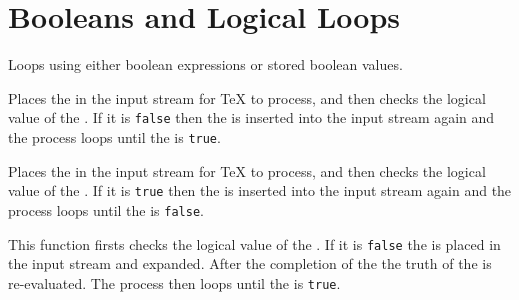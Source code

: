 \documentclass[oneside]{book}
\begin{document}
\section{Booleans and Logical Loops}

Loops using either boolean expressions or stored boolean values.

\begin{function}{\boolVarDoUntil}
\begin{syntax}
  
\end{syntax}
Places the  in the input stream for \TeX{} to process,
and then checks the logical value of the .  If it is
\texttt{false} then the  is inserted into the input
stream again and the process loops until the  is
\texttt{true}.
\begin{demohigh}
\IgnoreSpacesOn
\boolSetFalse \lTmpaBool
\intZero \lTmpaInt
\clistClear \lTmpaClist
\boolVarDoUntil {}
\clistVarJoin \lTmpaClist {:}
\IgnoreSpacesOff
\end{demohigh}
\end{function}

\begin{function}{\boolVarDoWhile}
\begin{syntax}
  
\end{syntax}
Places the  in the input stream for \TeX{} to process,
and then checks the logical value of the .  If it is
\texttt{true} then the  is inserted into the input
stream again and the process loops until the  is
\texttt{false}.
\begin{demohigh}
\IgnoreSpacesOn
\boolSetTrue \lTmpaBool
\intZero \lTmpaInt
\clistClear \lTmpaClist
\boolVarDoWhile {}
\clistVarJoin \lTmpaClist {:}
\IgnoreSpacesOff
\end{demohigh}
\end{function}

\begin{function}{\boolVarUntilDo}
\begin{syntax}
  
\end{syntax}
This function firsts checks the logical value of the .
If it is \texttt{false} the  is placed in the input stream
and expanded. After the completion of the  the truth
of the  is re-evaluated. The process then loops
until the  is \texttt{true}.
\begin{demohigh}
\IgnoreSpacesOn
\boolSetFalse \lTmpaBool
\intZero \lTmpaInt
\clistClear \lTmpaClist
\boolVarUntilDo {}
\clistVarJoin \lTmpaClist {:}
\IgnoreSpacesOff
\end{demohigh}
\end{function}
\end{document}

